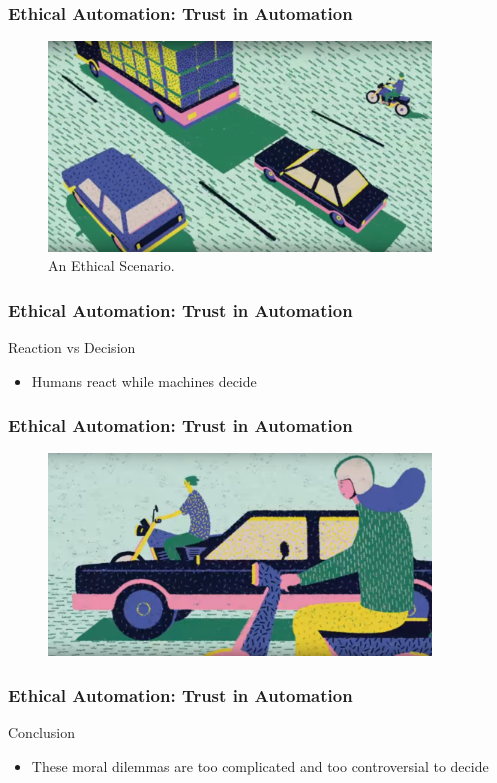 \begin{frame}
  \frametitle{ Ethical Automation: Trust in Automation}
  \begin{figure}[bht]
    \centering
    \includegraphics[width=4.0in]{diagrams/image00}
    \caption{An Ethical Scenario.}
  \end{figure}
\end{frame}


\begin{frame}
  \frametitle{ Ethical Automation: Trust in Automation}
  {\Large Reaction vs Decision}
  \begin{itemize}
    \item Humans react while machines decide
  \end{itemize}
\end{frame}


\begin{frame}
  \frametitle{ Ethical Automation: Trust in Automation}
  \begin{figure}[bht]
    \centering
    \includegraphics[width=4in]{diagrams/image01}
  \end{figure}
\end{frame}


\begin{frame}
  \frametitle{ Ethical Automation: Trust in Automation}
  {\Large Conclusion}
  \begin{itemize}
    \item These moral dilemmas are too complicated and too controversial to decide
  \end{itemize}
\end{frame}


